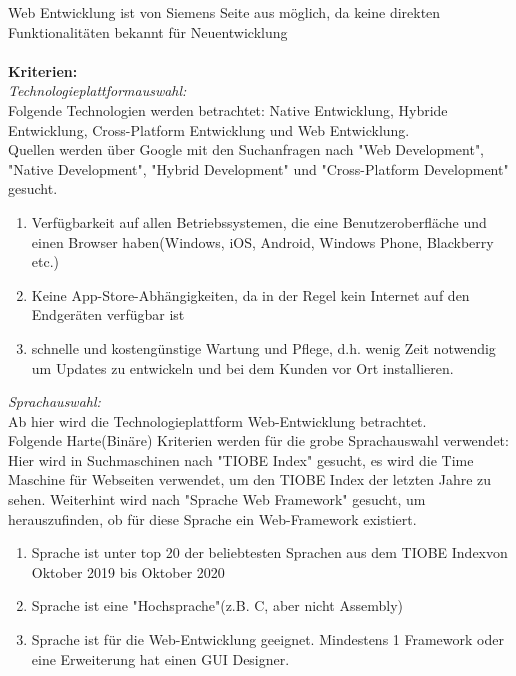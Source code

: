 \documentclass{article}
\begin{document}
    \pagestyle{empty}
    \noindent
    Web Entwicklung ist von Siemens Seite aus möglich, da keine direkten Funktionalitäten bekannt für Neuentwicklung\\\\
    \textbf{Kriterien:}\\
    \textit{Technologieplattformauswahl:}\\
    Folgende Technologien werden betrachtet: Native Entwicklung, Hybride Entwicklung, Cross-Platform Entwicklung und Web Entwicklung.\\
    Quellen werden über Google mit den Suchanfragen nach "{}Web Development"{}, "{}Native Development"{}, "{}Hybrid Development"{} und "{}Cross-Platform Development"{} gesucht.
    \begin{enumerate}
        \item Verfügbarkeit auf allen Betriebssystemen, die eine Benutzeroberfläche und einen Browser haben(Windows, iOS, Android, Windows Phone, Blackberry etc.)
        \item Keine App-Store-Abhängigkeiten, da in der Regel kein Internet auf den Endgeräten verfügbar ist
        \item schnelle und kostengünstige Wartung und Pflege, d.h. wenig Zeit notwendig um Updates zu entwickeln und bei dem Kunden vor Ort installieren.
    \end{enumerate}
    \textit{Sprachauswahl:}\\
    Ab hier wird die Technologieplattform Web-Entwicklung betrachtet.\\
    Folgende Harte(Binäre) Kriterien werden für die grobe Sprachauswahl verwendet:
    Hier wird in Suchmaschinen nach "{}TIOBE Index"{} gesucht, es wird die Time Maschine für Webseiten verwendet, um den TIOBE Index der letzten Jahre zu sehen. Weiterhint wird nach "{}Sprache Web Framework"{} gesucht, um herauszufinden, ob für diese Sprache ein Web-Framework existiert.
    \begin{enumerate}
        \item Sprache ist unter top 20 der beliebtesten Sprachen aus dem TIOBE Indexvon Oktober 2019 bis Oktober 2020
        \item Sprache ist eine "{}Hochsprache"{}(z.B. C, aber nicht Assembly)
        \item Sprache ist für die Web-Entwicklung geeignet. Mindestens 1 Framework oder eine Erweiterung hat einen GUI Designer.
    \end{enumerate}
\end{document}
